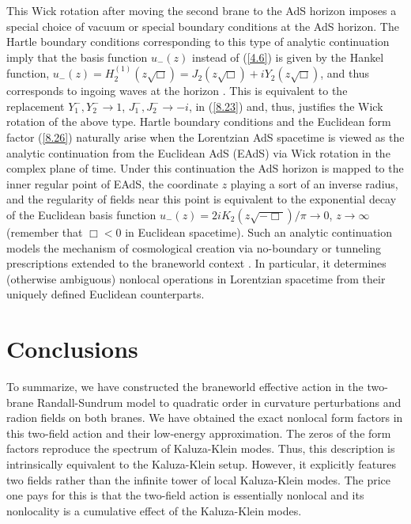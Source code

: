 \documentclass[a4paper,preprint,nofootinbib,
                 showpacs,preprintnumbers,amsmath,amssymb]{revtex4}
\begin{document}
This Wick rotation after moving the second brane to the AdS 
horizon imposes a special choice of vacuum or special boundary 
conditions at the AdS horizon. The Hartle boundary conditions 
corresponding to this type of analytic continuation imply that the 
basis function $u_-(z)$ instead of (\ref{4.6}) is given by the 
Hankel function, 
$u_-(z)=H^{(1)}_2(z\sqrt\Box)=J_2(z\sqrt\Box)+iY_2(z\sqrt\Box)$, 
and thus corresponds to ingoing waves at the horizon 
\cite{GKR,BalGiLa,BalKraLa}. This is equivalent to the replacement 
$Y_1^-,Y_2^-\to1$, $J_1^-,J_2^-\to-i$, in (\ref{8.23}) and, thus, 
justifies the Wick rotation of the above type. Hartle boundary 
conditions and the Euclidean form factor (\ref{8.26}) naturally 
arise when the Lorentzian AdS spacetime is viewed as the analytic 
continuation from the Euclidean AdS (EAdS) via Wick rotation in 
the complex plane of time. Under this continuation the AdS horizon 
is mapped to the inner regular point of EAdS, the coordinate $z$ 
playing a sort of an inverse radius, and the regularity of fields 
near this point is equivalent to the exponential decay of the 
Euclidean basis function $u_-(z)=2iK_2(z\sqrt{-\Box})/\pi\to 0$, 
$z\to\infty$ (remember that $\Box<0$ in Euclidean spacetime). Such 
an analytic continuation models the mechanism of cosmological 
creation via no-boundary \cite{HH} or tunneling \cite{tun} 
prescriptions extended to the braneworld context 
\cite{GarSas,HHR1,HHR2,brane}. In particular, it determines 
(otherwise ambiguous) nonlocal operations in Lorentzian spacetime 
from their uniquely defined Euclidean counterparts. 
 
 
\section{Conclusions\label{conclusions}} 
 
To summarize, we have constructed the braneworld effective action in the 
two-brane Randall-Sundrum model to quadratic order in curvature perturbations 
and radion fields on both branes. We have obtained the exact nonlocal form 
factors in this two-field action and their low-energy approximation. The zeros 
of the form factors reproduce the spectrum of Kaluza-Klein modes. Thus, this 
description is intrinsically equivalent to the Kaluza-Klein setup.  However, 
it explicitly features two fields rather than the infinite tower of local 
Kaluza-Klein modes. The price one pays for this is that the 
two-field action is essentially nonlocal and its nonlocality is a cumulative 
effect of the Kaluza-Klein modes.  
 
\end{document}
